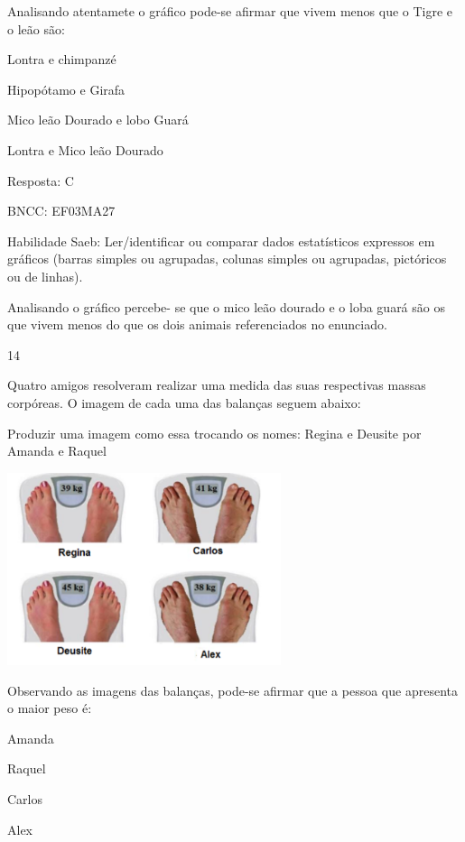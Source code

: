 \begin{escolha}
Analisando atentamete o gráfico pode-se afirmar que vivem menos que o
Tigre e o leão são:

\begin{escolha}

\item
  Lontra e chimpanzé
\item
  Hipopótamo e Girafa
\item
  Mico leão Dourado e lobo Guará
\item
  Lontra e Mico leão Dourado
\end{escolha}

Resposta: C

BNCC: EF03MA27

Habilidade Saeb: Ler/identificar ou comparar dados estatísticos
expressos em gráficos (barras simples ou agrupadas, colunas simples ou
agrupadas, pictóricos ou de linhas).

Analisando o gráfico percebe- se que o mico leão dourado e o loba guará
são os que vivem menos do que os dois animais referenciados no
enunciado.

\num{14}

Quatro amigos resolveram realizar uma medida das suas respectivas massas
corpóreas. O imagem de cada uma das balanças seguem abaixo:

Produzir uma imagem como essa trocando os nomes: Regina e Deusite por
Amanda e Raquel

\includegraphics[width=3.15196in,height=2.22201in]{media/image128.png}

Observando as imagens das balanças, pode-se afirmar que a pessoa que
apresenta o maior peso é:

\begin{escolha}

\item
  Amanda
\item
  Raquel
\item
  Carlos
\item
  Alex
\end{escolha}


\end{escolha}
